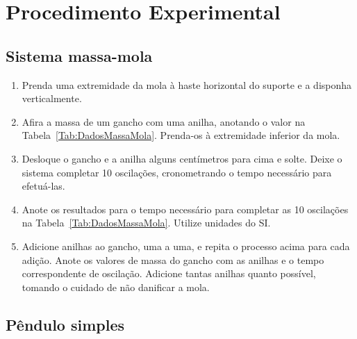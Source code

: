 \section{Procedimento Experimental}

\subsection{Sistema massa-mola}

\begin{enumerate}
\item Prenda uma extremidade da mola à haste horizontal do suporte e a disponha verticalmente.
\item Afira a massa de um gancho com uma anilha, anotando o valor na Tabela~\ref{Tab:DadosMassaMola}. Prenda-os à extremidade inferior da mola.
\item Desloque o gancho e a anilha alguns centímetros para cima e solte. Deixe o sistema completar 10 oscilações, cronometrando o tempo necessário para efetuá-las.
\item Anote os resultados para o tempo necessário para completar as 10 oscilações na Tabela~\ref{Tab:DadosMassaMola}. Utilize unidades do SI.
\item Adicione anilhas ao gancho, uma a uma, e repita o processo acima para cada adição. Anote os valores de massa do gancho com as anilhas e o tempo correspondente de oscilação. Adicione tantas anilhas quanto possível, tomando o cuidado de não danificar a mola.
\end{enumerate}

\subsection{Pêndulo simples}

